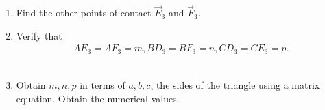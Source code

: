 \begin{enumerate}[label=\thesection.\arabic*.,ref=\thesection.\theenumi]
  \item Find the other points of contact $\vec{E}_3$ and $\vec{F}_3$.
  \\
		
	\item Verify that 
		\begin{align}
			AE_3 = AF_3=m, BD_3 = BF_3=n, CD_3 = CE_3=p.
		\end{align}
  \\	
	\item Obtain $m,n,p$ in terms of $a,b,c$, the sides of the triangle using a matrix equation.  Obtain the numerical values.
 \\
 		
\end{enumerate}
